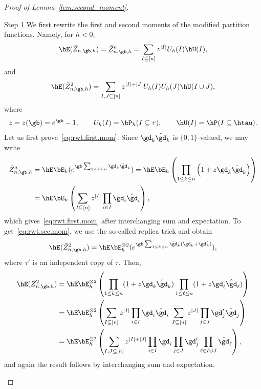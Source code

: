 \begin{proof}[Proof of Lemma~\ref{lem:second_moment}]
\begin{step}{Step 1}
We first rewrite the first and second moments of the modified partition functions. Namely, for $h < 0$,
\begin{equation}\label{eq:rwt.first.mom}
\hE(\bar Z_{n,\gb,h}) = \bar Z_{n,\gb,h}^a = \sum_{I \subseteq [n]} z^{|I|} U_h(I) \hU(I),
\end{equation}
and
\begin{equation}\label{eq:rwt.sec.mom}
\hE(\bar Z_{n,\gb,h}^2) = \sum_{I,J \subseteq [n]} z^{|I|+|J|} U_h(I) U_h(J) \hU(I \cup J),
\end{equation}
where
\begin{equation}\label{eq:def.zbeta}
z = z(\gb) = e^{\gb} - 1, \qquad U_h(I) = \bP_h(I \subseteq \tau), \qquad \hU(I) = \hP(I \subseteq \htau).
\end{equation}
Let us first prove~\eqref{eq:rwt.first.mom}. Since $\gd_k \hat \gd_k$ is $\{0,1\}$-valued, we may write
\begin{equation}
\begin{aligned}
\bar Z_{n,\gb,h}^a &= \hE \bE_h(e^{\gb \sum_{1 \leq k \leq n} \gd_k \hat \gd_k}) = \hE \bE_h \left(\prod_{1 \leq k \leq n} \left(1 + z \gd_k \hat \gd_k\right) \right)\\
&= \hE \bE_h \left(\sum_{I \subseteq [n]} z^{|I|} \prod_{i \in I} \gd_i \hat \gd_i \right),
\end{aligned}
\end{equation}
which gives~\eqref{eq:rwt.first.mom} after interchanging sum and expectation. To get~\eqref{eq:rwt.sec.mom}, we use the so-called replica trick and obtain
\begin{equation}
\hE(\bar Z_{n,\gb,h}^2) = \hE \bE_h^{\otimes 2}(e^{\gb \sum_{1 \leq k \leq n} \hat \gd_k (\gd_k + \gd_k')}),
\end{equation}
where $\tau'$ is an independent copy of $\tau$. Then,
\begin{equation}
\begin{aligned}
\hE(\bar Z_{n,\gb,h}^2) &= \hE \bE_h^{\otimes 2} \left(\prod_{1 \leq k \leq n} (1 + z \gd_k \hat \gd_k) \prod_{1 \leq \ell \leq n} (1 + z \gd_\ell \hat \gd_\ell) \right)\\
&= \hE \bE_h^{\otimes 2} \left(\sum_{I \subseteq [n]} z^{|I|} \prod_{i \in I} \gd_i \hat \gd_i \, \sum_{J \subseteq [n]} z^{|J|} \prod_{j \in J} \gd_j' \hat \gd_j \right)\\
& = \hE \bE_h^{\otimes 2} \left(\sum_{I,J \subseteq [n]} z^{|I| + |J|} \prod_{i \in I} \gd_i \prod_{j \in J} \gd_j' \prod_{\ell \in I \cup J} \hat \gd_\ell \right),
\end{aligned}
\end{equation}
and again the result follows by interchanging sum and expectation.
\end{step}


\end{proof}
